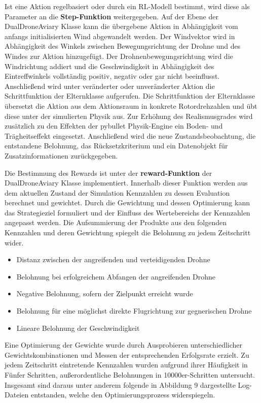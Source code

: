 Ist eine Aktion regelbasiert oder durch ein RL-Modell bestimmt, wird diese als Parameter an die \textbf{Step-Funktion} weitergegeben.
Auf der Ebene der DualDroneAviary Klasse kann die übergebene Aktion in Abhängigkeit vom anfangs initialisierten Wind abgewandelt werden.
Der Windvektor wird in Abhängigkeit des Winkels zwischen Bewegungsrichtung der Drohne und des Windes zur Aktion hinzugefügt.
Der Drohnenbewegungsrichtung wird die Windrichtung addiert und die Geschwindigkeit in Abhängigkeit des Eintreffwinkels vollständig positiv, negativ oder gar nicht beeinflusst.
Anschließend wird unter veränderter oder unveränderter Aktion die Schrittfunktion der Elternklasse aufgerufen.
Die Schrittfunktion der Elternklasse übersetzt die Aktion aus dem Aktionsraum in konkrete Rotordrehzahlen und übt diese unter der simulierten Physik aus.
Zur Erhöhung des Realismusgrades wird zusätzlich zu den Effekten der pybullet Physik-Engine ein Boden- und Trägheitseffekt eingesetzt.
Anschließend wird die neue Zustandsbeobachtung, die entstandene Belohnung, das Rücksetzkriterium und ein Datenobjekt für Zusatzinformationen zurückgegeben.

Die Bestimmung des Rewards ist unter der \textbf{reward-Funktion} der DualDroneAviary Klasse implementiert.
Innerhalb dieser Funktion werden aus dem aktuellen Zustand der Simulation Kennzahlen zu dessen Evaluation berechnet und gewichtet.
Durch die Gewichtung und dessen Optimierung kann das Strategieziel formuliert und der Einfluss des Wertebereichs der Kennzahlen angepasst werden.
Die Aufsummierung der Produkte aus den folgenden Kennzahlen und deren Gewichtung spiegelt die Belohnung zu jedem Zeitschritt wider.
\begin{itemize}
    \item Distanz zwischen der angreifenden und verteidigenden Drohne
    \item Belohnung bei erfolgreichem Abfangen der angreifenden Drohne
    \item Negative Belohnung, sofern der Zielpunkt erreicht wurde
    \item Belohnung für eine möglichst direkte Flugrichtung zur gegnerischen Drohne
    \item Lineare Belohnung der Geschwindigkeit
\end{itemize}
Eine Optimierung der Gewichte wurde durch Ausprobieren unterschiedlicher Gewichtskombinationen und Messen der entsprechenden Erfolgsrate erzielt.
Zu jedem Zeitschritt eintretende Kennzahlen wurden aufgrund ihrer Häufigkeit in Fünfer Schritten, außerordentliche Belohnungen in 10000er-Schritten untersucht.
Insgesamt sind daraus unter anderem folgende in Abbildung 9 dargestellte Log-Dateien entstanden, welche den Optimierungsprozess widerspiegeln.

